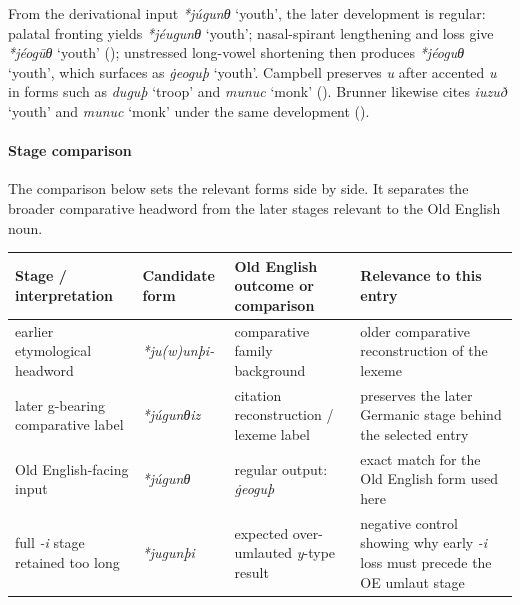 \documentclass[
  british,
  a4paper,
]{article}
\newcounter{none} %
\providecommand{\Recon}[1]{\emph{*#1}}
\begin{document}
From the derivational input \Recon{júgunθ} `youth', the later
development is regular: palatal fronting yields \Recon{jéugunθ} `youth';
nasal-spirant lengthening and loss give \Recon{jéogūθ} `youth'
(); unstressed long-vowel
shortening then produces \Recon{jéoguθ} `youth', which surfaces as
{\emph{ġeoguþ}} `youth'. Campbell preserves \emph{u} after accented
\emph{u} in forms such as {\emph{duguþ}} `troop' and {\emph{munuc}}
`monk' (). Brunner
likewise cites {\emph{iuzuð}} `youth' and {\emph{munuc}} `monk' under
the same development ().

\paragraph{Stage comparison}\label{stage-comparison-4}

The comparison below sets the relevant forms side by side. It separates
the broader comparative headword from the later stages relevant to the
Old English noun.

{\def\LTcaptype{none} %
\begin{longtable}[]{@{}
  >{\raggedright\arraybackslash}p{}
  >{\raggedright\arraybackslash}p{}
  >{\raggedright\arraybackslash}p{}
  >{\raggedright\arraybackslash}p{}@{}}
\toprule\noalign{}
\begin{minipage}[b]{\linewidth}\raggedright
Stage / interpretation
\end{minipage} & \begin{minipage}[b]{\linewidth}\raggedright
Candidate form
\end{minipage} & \begin{minipage}[b]{\linewidth}\raggedright
Old English outcome or comparison
\end{minipage} & \begin{minipage}[b]{\linewidth}\raggedright
Relevance to this entry
\end{minipage} \\
\midrule\noalign{}
\endhead
\bottomrule\noalign{}
\endlastfoot
earlier etymological headword & {\emph{*ju(w)unþi-}} & comparative
family background & older comparative reconstruction of the lexeme \\
later g-bearing comparative label & {\emph{*júgunθiz}} & citation
reconstruction / lexeme label & preserves the later Germanic stage
behind the selected entry \\
Old English-facing input & {\emph{*júgunθ}} & regular output:
{\emph{ġeoguþ}} & exact match for the Old English form used here \\
full \emph{-i} stage retained too long & {\emph{*jugunþi}} & expected
over-umlauted \emph{y}-type result & negative control showing why early
\emph{-i} loss must precede the OE umlaut stage \\
\end{longtable}
}
\end{document}
